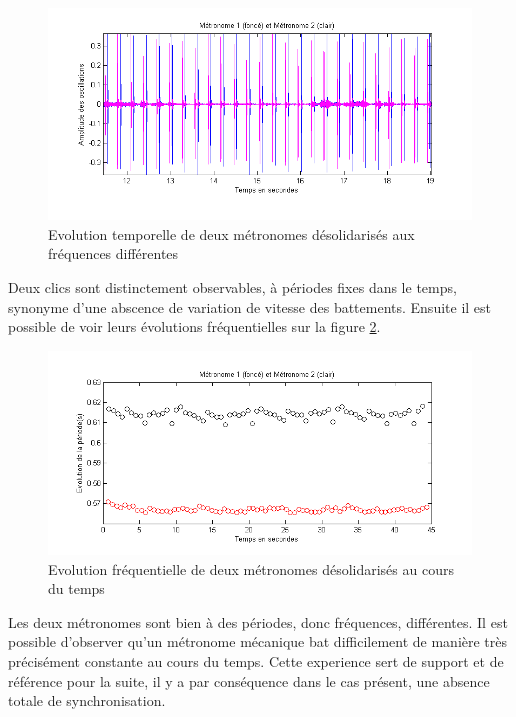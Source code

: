 \documentclass[a4paper,11pt]{report}
\begin{document}
\begin{figure}[h]
\centering
\includegraphics[width=1\textwidth]{Caracterisation_temporelle_200BPM}
\caption{Evolution temporelle de deux métronomes désolidarisés aux fréquences différentes}\label{CaractérisationT}
\end{figure}

Deux clics sont distinctement observables, à périodes fixes dans le temps, synonyme d'une abscence de variation de vitesse des battements. Ensuite il est possible de voir leurs évolutions fréquentielles sur la figure \ref{CaractérisationF}.

\begin{figure}[h]
\centering
\includegraphics[width=1\textwidth]{Caracterisation_Frequence_200BPM}
\caption{Evolution fréquentielle de deux métronomes désolidarisés au cours du temps}\label{CaractérisationF}
\end{figure}

Les deux métronomes sont bien à des périodes, donc fréquences, différentes. Il est possible d'observer qu'un métronome mécanique bat difficilement de manière très précisément constante au cours du temps. Cette experience sert de support et de référence pour la suite, il y a par conséquence dans le cas présent, une absence totale de synchronisation.
\end{document}
